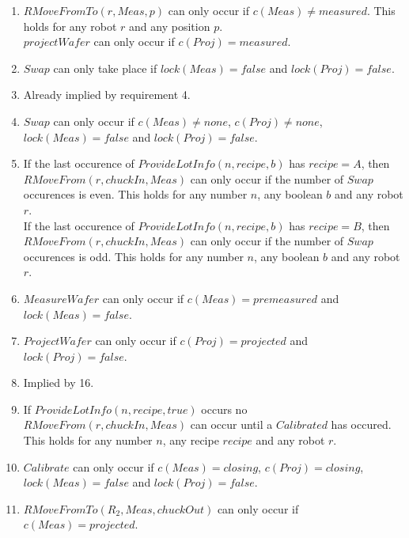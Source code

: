 \begin{enumerate}
	\item $RMoveFromTo(r, Meas, p)$ can only occur if $c(Meas) \neq measured$. This holds for any robot $r$ and any position $p$.\\
	$projectWafer$ can only occur if $c(Proj) = measured$.
	\item $Swap$ can only take place if $lock(Meas) = false$ and $lock(Proj) = false$.
	\item Already implied by requirement 4.
	\item $Swap$ can only occur if $c(Meas) \neq none$, $c(Proj) \neq none$, $lock(Meas) =false$ and $lock(Proj) = false$.
	\item If the last occurence of $ProvideLotInfo(n,recipe,b)$ has $recipe=A$, then $RMoveFrom(r,chuckIn,Meas)$ can only occur if the number of $Swap$ occurences is even. This holds for any number $n$, any boolean $b$ and any robot $r$.\\
	If the last occurence of $ProvideLotInfo(n,recipe,b)$ has $recipe=B$, then $RMoveFrom(r,chuckIn,Meas)$ can only occur if the number of $Swap$ occurences is odd. This holds for any number $n$, any boolean $b$ and any robot $r$.\\
	\item $MeasureWafer$ can only occur if $c(Meas) = premeasured$ and $lock(Meas) = false$.
	\item $ProjectWafer$ can only occur if $c(Proj) = projected$ and $lock(Proj) = false$.
	\item Implied by 16.
	\item If $ProvideLotInfo(n,recipe,true)$ occurs no $RMoveFrom(r,chuckIn,Meas)$ can occur until a $Calibrated$ has occured. This holds for any number $n$, any recipe $recipe$ and any robot $r$.
	\item $Calibrate$ can only occur if $c(Meas) = closing$, $c(Proj) = closing$, $lock(Meas) = false$ and $lock(Proj) = false$.
	\item $RMoveFromTo(R_2, Meas, chuckOut)$ can only occur if $c(Meas) = projected$.
\end{enumerate}